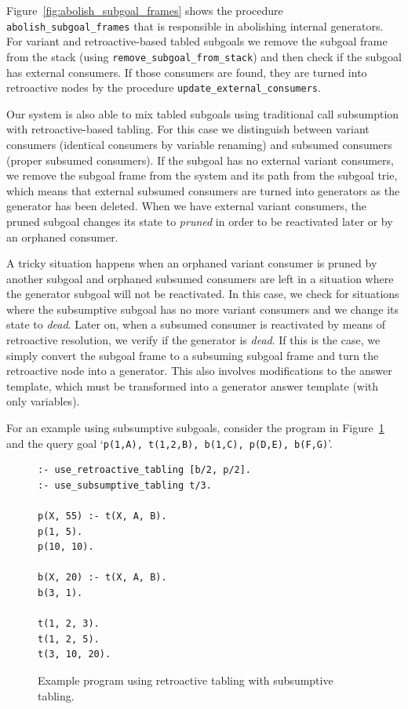 Figure~\ref{fig:abolish_subgoal_frames} shows the procedure \texttt{abolish\_subgoal\_frames} that is
responsible in abolishing internal generators. For variant and retroactive-based tabled subgoals we remove
the subgoal frame from the stack (using \texttt{remove\_subgoal\_from\_stack}) and then check if the
subgoal has external consumers. If those consumers are found, they are turned into retroactive nodes
by the procedure \texttt{update\_external\_consumers}.

Our system is also able to mix tabled subgoals using traditional call subsumption with retroactive-based tabling.
For this case we distinguish between variant consumers (identical consumers by variable renaming) and
subsumed consumers (proper subsumed consumers).
If the subgoal has no external variant consumers, we remove the subgoal frame from the system and
its path from the subgoal trie, which means that external subsumed consumers are turned into generators as
the generator has been deleted. When we have external variant consumers, the pruned subgoal changes its state
to \textit{pruned} in order to be reactivated later or by an orphaned consumer.

A tricky situation happens when an orphaned variant consumer is pruned by another subgoal and orphaned
subsumed consumers are left in a situation where the generator subgoal will not be reactivated. In this case,
we check for situations where the subsumptive subgoal has no more variant consumers and we change its state
to \textit{dead}. Later on, when a subsumed consumer is reactivated by means of retroactive resolution, we
verify if the generator is \textit{dead}. If this is the case, we simply convert the subgoal frame to a
subsuming subgoal frame and turn the retroactive node into a generator. This also involves modifications
to the answer template, which must be transformed into a generator answer template (with only variables).

For an example using subsumptive subgoals, consider the program in Figure~\ref{fig:retro_sub} and
the query goal `\texttt{p(1,A),~t(1,2,B),~b(1,C),~p(D,E),~b(F,G)}'.

\begin{figure}[ht]
\begin{Verbatim}
:- use_retroactive_tabling [b/2, p/2].
:- use_subsumptive_tabling t/3.

p(X, 55) :- t(X, A, B).
p(1, 5).
p(10, 10).

b(X, 20) :- t(X, A, B).
b(3, 1).

t(1, 2, 3).
t(1, 2, 5).
t(3, 10, 20).
\end{Verbatim}
\caption{Example program using retroactive tabling with subsumptive tabling.}
\label{fig:retro_sub}
\end{figure}

